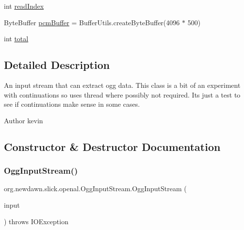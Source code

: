 \begin{DoxyCompactItemize}
\item 
int \mbox{\hyperlink{classorg_1_1newdawn_1_1slick_1_1openal_1_1_ogg_input_stream_a53b520bae4c31d5889485a0424f04478}{read\+Index}}
\item 
Byte\+Buffer \mbox{\hyperlink{classorg_1_1newdawn_1_1slick_1_1openal_1_1_ogg_input_stream_a94fa1c1b12bc33364d2d885c537cc232}{pcm\+Buffer}} = Buffer\+Utils.\+create\+Byte\+Buffer(4096 $\ast$ 500)
\item 
int \mbox{\hyperlink{classorg_1_1newdawn_1_1slick_1_1openal_1_1_ogg_input_stream_a4a836a2e04a88ae3dd2ae6ed471f3958}{total}}
\end{DoxyCompactItemize}


\subsection{Detailed Description}
An input stream that can extract ogg data. This class is a bit of an experiment with continuations so uses thread where possibly not required. It\textquotesingle{}s just a test to see if continuations make sense in some cases.

\begin{DoxyAuthor}{Author}
kevin 
\end{DoxyAuthor}


\subsection{Constructor \& Destructor Documentation}
\mbox{\label{classorg_1_1newdawn_1_1slick_1_1openal_1_1_ogg_input_stream_a51094c8847e2ffa7765a3cbc4e6c4925}} 
\subsubsection{\texorpdfstring{Ogg\+Input\+Stream()}{OggInputStream()}}
{\footnotesize\ttfamily org.\+newdawn.\+slick.\+openal.\+Ogg\+Input\+Stream.\+Ogg\+Input\+Stream (\begin{DoxyParamCaption}\item[{Input\+Stream}]{input }\end{DoxyParamCaption}) throws I\+O\+Exception\hspace{0.3cm}{\ttfamily [inline]}}

